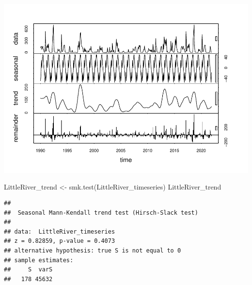 \documentclass[
  12pt,
]{article}
\newenvironment{Shaded}{\begin{snugshade}}{\end{snugshade}}
\newcommand{\AttributeTok}[1]{\textcolor[rgb]{0.77,0.63,0.00}{#1}}
\newcommand{\CommentTok}[1]{\textcolor[rgb]{0.56,0.35,0.01}{\textit{#1}}}
\newcommand{\DecValTok}[1]{\textcolor[rgb]{0.00,0.00,0.81}{#1}}
\newcommand{\FunctionTok}[1]{\textcolor[rgb]{0.00,0.00,0.00}{#1}}
\newcommand{\NormalTok}[1]{#1}
\newcommand{\OtherTok}[1]{\textcolor[rgb]{0.56,0.35,0.01}{#1}}
\newcommand{\SpecialCharTok}[1]{\textcolor[rgb]{0.00,0.00,0.00}{#1}}
\newcommand{\StringTok}[1]{\textcolor[rgb]{0.31,0.60,0.02}{#1}}
\begin{document}
\begin{Shaded}
\end{Shaded}

\includegraphics{Project_files/figure-latex/time-series analysis on Regular Water Resources-3.pdf}

\begin{Shaded}
\begin{Highlighting}[]
\NormalTok{LittleRiver\_trend }\OtherTok{\textless{}{-}} \FunctionTok{smk.test}\NormalTok{(LittleRiver\_timeseries)}
\NormalTok{LittleRiver\_trend}
\end{Highlighting}
\end{Shaded}

\begin{verbatim}
## 
##  Seasonal Mann-Kendall trend test (Hirsch-Slack test)
## 
## data:  LittleRiver_timeseries
## z = 0.82859, p-value = 0.4073
## alternative hypothesis: true S is not equal to 0
## sample estimates:
##     S  varS 
##   178 45632
\end{verbatim}
\end{document}

